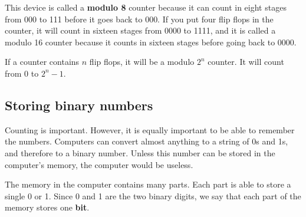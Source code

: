 This device is called a {\bf modulo 8} counter because it can count in eight stages from 000 to 111 before it goes back to 000.  If you put four flip flops in the counter, it will count in sixteen stages from 0000 to 1111, and it is called a modulo 16 counter because it counts in sixteen stages before going back to 0000.


\begin{IFact}{If a counter contains $n$ flip flops, it will be a modulo $2^{n}$ counter.  It will count from 0 to $2^{n} - 1$.}\end{IFact}

\subsection{Storing binary numbers}

Counting is important.  However, it is equally important to be able to remember the numbers.  Computers can convert almost anything to a string of 0s and 1s, and therefore to a binary number.  Unless this number can be stored in the computer's memory, the computer would be useless.

The memory in the computer contains many parts.  Each part is able to store a single 0 or 1.  Since 0 and 1 are the two binary digits, we say that each part of the memory stores one {\bf bit}.




